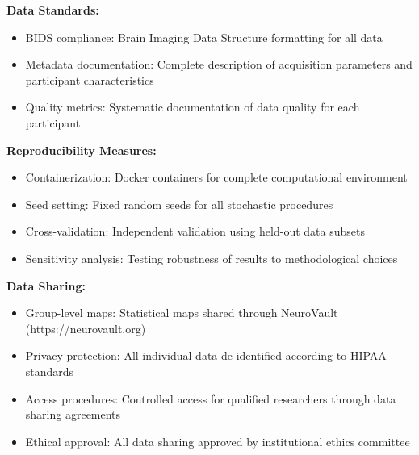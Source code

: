 \noindent
\textbf{Data Standards:}
\begin{itemize}
\item BIDS compliance: Brain Imaging Data Structure formatting for all data
\item Metadata documentation: Complete description of acquisition parameters and participant characteristics
\item Quality metrics: Systematic documentation of data quality for each participant
\end{itemize}

\noindent
\textbf{Reproducibility Measures:}
\begin{itemize}
\item Containerization: Docker containers for complete computational environment
\item Seed setting: Fixed random seeds for all stochastic procedures
\item Cross-validation: Independent validation using held-out data subsets
\item Sensitivity analysis: Testing robustness of results to methodological choices
\end{itemize}

\noindent
\textbf{Data Sharing:}
\begin{itemize}
\item Group-level maps: Statistical maps shared through NeuroVault (https://neurovault.org)
\item Privacy protection: All individual data de-identified according to HIPAA standards
\item Access procedures: Controlled access for qualified researchers through data sharing agreements
\item Ethical approval: All data sharing approved by institutional ethics committee
\end{itemize}